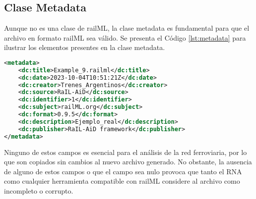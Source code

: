 \subsection{Clase Metadata}
    \label{sec:metadata}

    Aunque no es una clase de railML, la clase metadata es fundamental para que el archivo en formato railML sea válido. Se presenta el Código \ref{lst:metadata} para ilustrar los elementos presentes en la clase metadata.
    
    \begin{lstlisting}[language = XML, caption = Clase metadata, label = {lst:metadata}]
<metadata>
    <dc:title>Example_9.railml</dc:title>
    <dc:date>2023-10-04T10:51:21Z</dc:date>
    <dc:creator>Trenes_Argentinos</dc:creator>
    <dc:source>RaIL-AiD</dc:source>
    <dc:identifier>1</dc:identifier>
    <dc:subject>railML.org</dc:subject>
    <dc:format>0.9.5</dc:format>
    <dc:description>Ejemplo_real</dc:description>
    <dc:publisher>RaIL-AiD framework</dc:publisher>
</metadata>
    \end{lstlisting}

    Ninguno de estos campos es esencial para el análisis de la red ferroviaria, por lo que son copiados sin cambios al nuevo archivo generado. No obstante, la ausencia de alguno de estos campos o que el campo sea nulo provoca que tanto el RNA como cualquier herramienta compatible con railML considere al archivo como incompleto o corrupto.